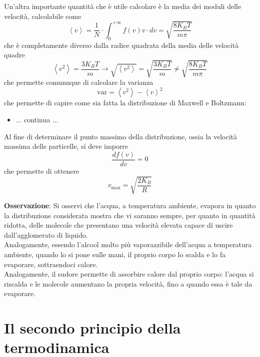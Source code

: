\documentclass[a4paper]{extarticle}
\begin{document}
\vspace{1em}
\noindent
Un'altra importante quantità che è utile calcolare è la media dei moduli delle velocità, calcolabile come
\[\left<v\right> = \frac{1}{N} \cdot \int_0^{+\infty} f(v) v \cdot dv = \sqrt{\frac{8 K_B T}{m \pi}}\]
che è completamente diverso dalla radice quadrata della media delle velocità quadre
\[\left<v^2\right> = \frac{3 K_B T}{m} \longrightarrow \sqrt{\left<v^2\right>} = \sqrt{\frac{3 K_B T}{m}} \neq \sqrt{\frac{8 K_B T}{m \pi}}\]
che permette comunnque di calcolare la varianza
\[\text{var} = \left<v^2\right> - \left<v\right>^2\]
che permette di capire come sia fatta la distribuzione di Maxwell e Boltzmann:
\begin{itemize}
  \item ... continua ...
\end{itemize}
Al fine di determinare il punto massimo della distribuzione, ossia la velocità massima delle particelle, si deve imporre
\[\frac{d f(v)}{d v} = 0\]
che permette di ottenere
\[v_{\text{max}} = \sqrt{\frac{2 K_B}{R}}\]

\vspace{1em}
\noindent
\textbf{Osservazione}: Si osservi che l'acqua, a temperatura ambiente, evapora in quanto la distribuzione considerata mostra che vi saranno sempre, per quanto in quantità ridotta, delle molecole che presentano una velocità elevata capace di uscire dall'agglomerato di liquido.\\
Analogamente, essendo l'alcool molto più vaporazzibile dell'acqua a temperatura ambiente, quando lo si pone sulle mani, il proprio corpo lo scalda e lo fa evaporare, sottraendoci calore.\\
Analogamente, il sudore permette di assorbire calore dal proprio corpo: l'acqua si riscalda e le molecole aumentano la propria velocità, fino a quando essa è tale da evaporare.

\newpage
\section{Il secondo principio della termodinamica}
\end{document}
